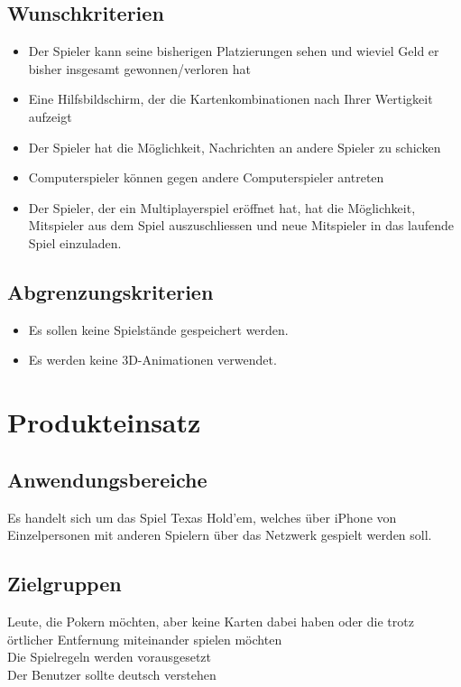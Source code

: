 \documentclass[a4paper,12pt,bibtotoc, parskip=full]{article}
\begin{document}
\subsection{Wunschkriterien}
\begin{itemize}
\item Der Spieler kann seine bisherigen Platzierungen sehen und wieviel Geld er bisher insgesamt gewonnen/verloren hat
\item Eine Hilfsbildschirm, der die Kartenkombinationen nach Ihrer Wertigkeit aufzeigt
\item Der Spieler hat die Möglichkeit, Nachrichten an andere Spieler zu schicken
\item Computerspieler können gegen andere Computerspieler antreten
\item Der Spieler, der ein Multiplayerspiel eröffnet hat, hat die Möglichkeit, Mitspieler aus dem Spiel auszuschliessen und neue Mitspieler in das laufende Spiel einzuladen. 
\end{itemize}
\subsection{Abgrenzungskriterien}
\begin{itemize}
\item Es sollen keine Spielstände gespeichert werden.
\item Es werden keine 3D-Animationen verwendet.
\end{itemize}
\newpage


\section{Produkteinsatz}
\subsection{Anwendungsbereiche}
Es handelt sich um das Spiel Texas Hold'em, welches über iPhone von Einzelpersonen mit anderen Spielern über das Netzwerk  gespielt werden soll.

\subsection{Zielgruppen}
Leute, die Pokern möchten, aber keine Karten dabei haben oder die trotz örtlicher Entfernung miteinander spielen möchten\\
Die Spielregeln werden vorausgesetzt\\
Der Benutzer sollte deutsch verstehen
\newpage
\end{document}
